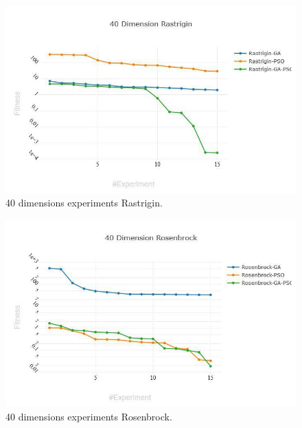 \documentclass[runningheads]{llncs}
\begin{document}
        \begin{figure}[htp]
          \includegraphics[width=\textwidth]{40-rastrigin.jpg}
          \caption{40 dimensions experiments Rastrigin.} \label{fig1}
          \end{figure}

          \begin{figure}[htp]
            \includegraphics[width=\textwidth]{40-rosenbrock.jpg}
            \caption{40 dimensions experiments Rosenbrock.} \label{fig1}
            \end{figure}
\end{document}
